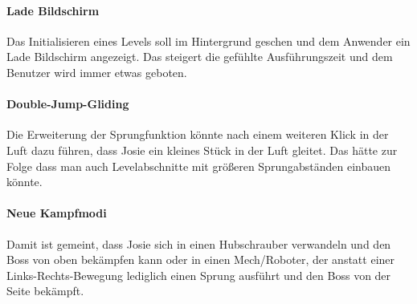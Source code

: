 \paragraph{Lade Bildschirm}
Das Initialisieren eines Levels soll im Hintergrund geschen und dem Anwender ein Lade Bildschirm angezeigt. Das steigert die gefühlte Ausführungszeit und dem Benutzer wird immer etwas geboten.

\paragraph{Double-Jump-Gliding}
Die Erweiterung der Sprungfunktion könnte nach einem weiteren Klick in der Luft dazu führen, dass Josie ein kleines Stück in der Luft gleitet. Das hätte zur Folge dass man auch Levelabschnitte mit größeren Sprungabständen einbauen könnte.

\paragraph{Neue Kampfmodi}
Damit ist gemeint, dass Josie sich in einen Hubschrauber verwandeln und den Boss von oben bekämpfen kann oder in einen Mech/Roboter, der anstatt einer Links-Rechts-Bewegung lediglich einen Sprung ausführt und den Boss von der Seite bekämpft.
